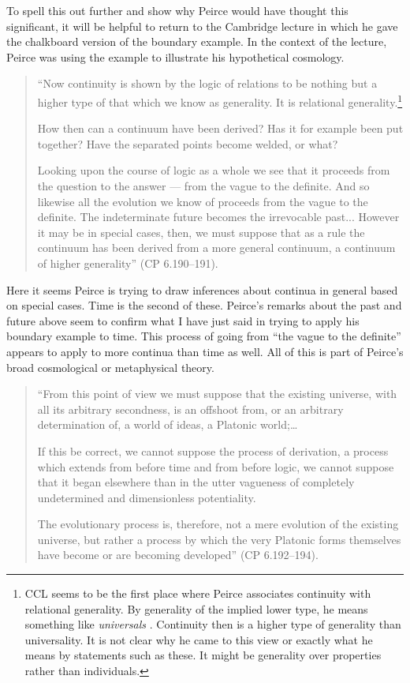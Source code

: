 To spell this out further and show why Peirce would have thought this significant, it will be helpful to return to the Cambridge lecture in which he gave the chalkboard version of the boundary example. In the context of the lecture, Peirce was using the example to illustrate his hypothetical cosmology. 
\begin{quotation}
\noindent``Now continuity is shown by the logic of relations to be nothing but a higher type of that which we know as generality. It is relational generality.\footnote{CCL seems to be the first place where Peirce associates continuity with relational generality. By generality of the implied lower type, he means something like \textit{universals} \citep{moore_genesis_2007}. Continuity then is a higher type of generality than universality. It is not clear why he came to this view or exactly what he means by statements such as these. It might be generality over properties rather than individuals.}

How then can a continuum have been derived? Has it for example been put together? Have the separated points become welded, or what?

Looking upon the course of logic as a whole we see that it proceeds from the question to the answer --- from the vague to the definite. And so likewise all the evolution we know of proceeds from the vague to the definite. The indeterminate future becomes the irrevocable past... However it may be in special cases, then, we must suppose that as a rule the continuum has been derived from a more general continuum, a continuum of higher generality'' (CP 6.190--191).
\end{quotation}
\noindent Here it seems Peirce is trying to draw inferences about continua in general based on special cases. Time is the second of these. Peirce's remarks about the past and future above seem to confirm what I have just said in trying to apply his boundary example to time. This process of going from ``the vague to the definite'' appears to apply to more continua than time as well. All of this is part of Peirce's broad cosmological or metaphysical theory.
\begin{quotation}
\noindent``From this point of view we must suppose that the existing universe, with all its arbitrary secondness, is an offshoot from, or an arbitrary determination of, a world of ideas, a Platonic world;\dots

If this be correct, we cannot suppose the process of derivation, a process which extends from before time and from before logic, we cannot suppose that it began elsewhere than in the utter vagueness of completely undetermined and dimensionless potentiality.

The evolutionary process is, therefore, not a mere evolution of the existing universe, but rather a process by which the very Platonic forms themselves have become or are becoming developed'' (CP 6.192--194).
\end{quotation}
